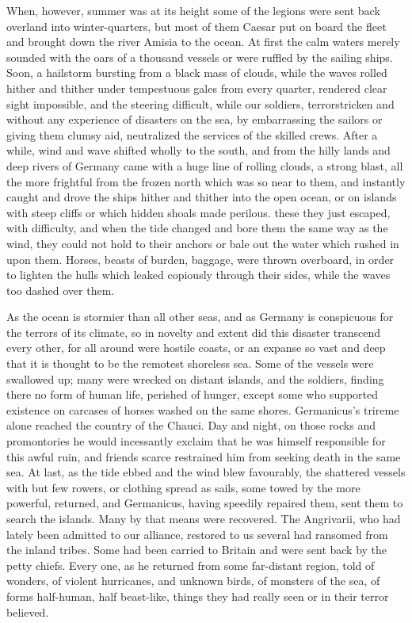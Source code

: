 When, however, summer was at its height some of the legions were sent back overland into winter-quarters, but most of them Caesar put on board the fleet and brought down the river Amisia to the ocean. At first the calm waters merely sounded with the oars of a thousand vessels or were ruffled by the sailing ships. Soon, a hailstorm bursting from a black mass of clouds, while the waves rolled hither and thither under tempestuous gales from every quarter, rendered clear sight impossible, and the steering difficult, while our soldiers, terrorstricken and without any experience of disasters on the sea, by embarrassing the sailors or giving them clumsy aid, neutralized the services of the skilled crews. After a while, wind and wave shifted wholly to the south, and from the hilly lands and deep rivers of Germany came with a huge line of rolling clouds, a strong blast, all the more frightful from the frozen north which was so near to them, and instantly caught and drove the ships hither and thither into the open ocean, or on islands with steep cliffs or which hidden shoals made perilous. these they just escaped, with difficulty, and when the tide changed and bore them the same way as the wind, they could not hold to their anchors or bale out the water which rushed in upon them. Horses, beasts of burden, baggage, were thrown overboard, in order to lighten the hulls which leaked copiously through their sides, while the waves too dashed over them.


As the ocean is stormier than all other seas, and as Germany is conspicuous for the terrors of its climate, so in novelty and extent did this disaster transcend every other, for all around were hostile coasts, or an expanse so vast and deep that it is thought to be the remotest shoreless sea. Some of the vessels were swallowed up; many were wrecked on distant islands, and the soldiers, finding there no form of human life, perished of hunger, except some who supported existence on carcases of horses washed on the same shores. Germanicus's trireme alone reached the country of the Chauci. Day and night, on those rocks and promontories he would incessantly exclaim that he was himself responsible for this awful ruin, and friends scarce restrained him from seeking death in the same sea. At last, as the tide ebbed and the wind blew favourably, the shattered vessels with but few rowers, or clothing spread as sails, some towed by the more powerful, returned, and Germanicus, having speedily repaired them, sent them to search the islands. Many by that means were recovered. The Angrivarii, who had lately been admitted to our alliance, restored to us several had ransomed from the inland tribes. Some had been carried to Britain and were sent back by the petty chiefs. Every one, as he returned from some far-distant region, told of wonders, of violent hurricanes, and unknown birds, of monsters of the sea, of forms half-human, half beast-like, things they had really seen or in their terror believed.

